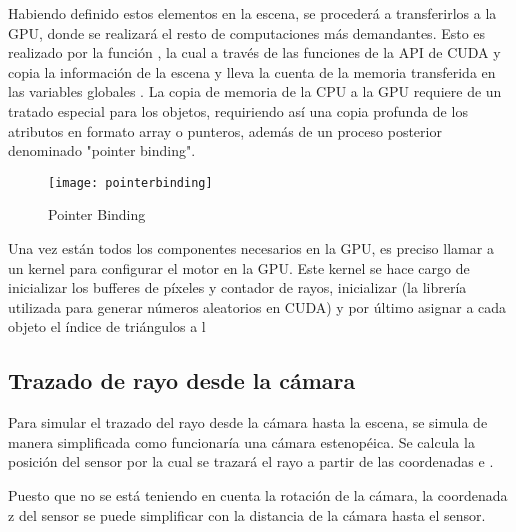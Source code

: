 Habiendo definido estos elementos en la escena, se procederá a transferirlos a la GPU, donde se realizará el resto de computaciones más demandantes. Esto es realizado por la función , la cual a través de las funciones de la API de CUDA  y  copia la información de la escena y lleva la cuenta de la memoria transferida en las variables globales . La copia de memoria de la CPU a la GPU requiere de un tratado especial para los objetos, requiriendo así una copia profunda de los atributos en formato array o punteros, además de un proceso posterior denominado "pointer binding".



\begin{figure}[H]
    \centering
	\texttt{[image: pointerbinding]}
	\caption{Pointer Binding}
	\label{fig:label}
\end{figure}

Una vez están todos los componentes necesarios en la GPU, es preciso llamar a un kernel para configurar el motor en la GPU. Este kernel  se hace cargo de inicializar los bufferes de píxeles y contador de rayos, inicializar  (la librería utilizada para generar números aleatorios en CUDA) y por último asignar a cada objeto el índice de triángulos a l




	\subsection{Trazado de rayo desde la cámara}

Para simular el trazado del rayo desde la cámara hasta la escena, se simula de manera simplificada como funcionaría una cámara estenopéica. Se calcula la posición del sensor por la cual se trazará el rayo a partir de las coordenadas  e . 

Puesto que no se está teniendo en cuenta la rotación de la cámara, la coordenada z del sensor se puede simplificar con la distancia de la cámara hasta el sensor.

